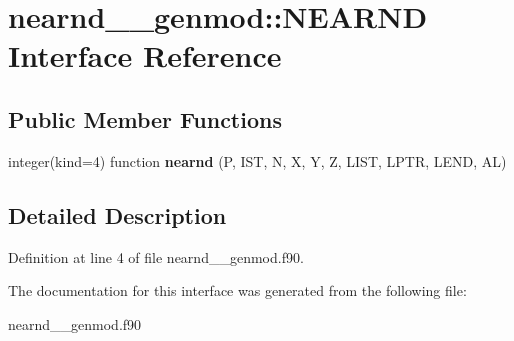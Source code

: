 \hypertarget{interfacenearnd____genmod_1_1_n_e_a_r_n_d}{\section{nearnd\+\_\+\+\_\+genmod\+:\+:N\+E\+A\+R\+N\+D Interface Reference}
\label{interfacenearnd____genmod_1_1_n_e_a_r_n_d}
}
\subsection*{Public Member Functions}
\begin{DoxyCompactItemize}
\item 
\hypertarget{interfacenearnd____genmod_1_1_n_e_a_r_n_d_a78c6c6d6c9d9a3fc2ecae4f4be9df010}{integer(kind=4) function {\bfseries nearnd} (P, I\+S\+T, N, X, Y, Z, L\+I\+S\+T, L\+P\+T\+R, L\+E\+N\+D, A\+L)}\label{interfacenearnd____genmod_1_1_n_e_a_r_n_d_a78c6c6d6c9d9a3fc2ecae4f4be9df010}

\end{DoxyCompactItemize}


\subsection{Detailed Description}


Definition at line 4 of file nearnd\+\_\+\+\_\+genmod.\+f90.



The documentation for this interface was generated from the following file\+:\begin{DoxyCompactItemize}
\item 
nearnd\+\_\+\+\_\+genmod.\+f90\end{DoxyCompactItemize}
